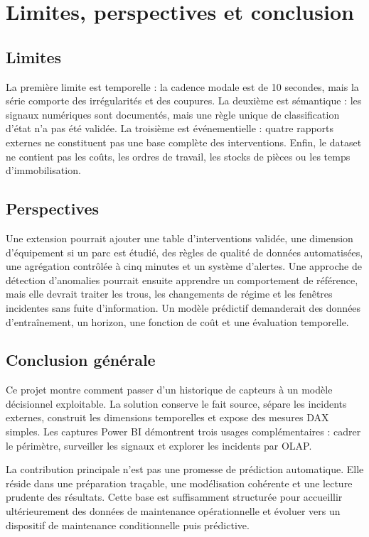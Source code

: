 \chapter{Limites, perspectives et conclusion}

\section{Limites}
La première limite est temporelle : la cadence modale est de 10 secondes, mais la série comporte des irrégularités et des coupures. La deuxième est sémantique : les signaux numériques sont documentés, mais une règle unique de classification d'état n'a pas été validée. La troisième est événementielle : quatre rapports externes ne constituent pas une base complète des interventions. Enfin, le dataset ne contient pas les coûts, les ordres de travail, les stocks de pièces ou les temps d'immobilisation.

\section{Perspectives}
Une extension pourrait ajouter une table d'interventions validée, une dimension d'équipement si un parc est étudié, des règles de qualité de données automatisées, une agrégation contrôlée à cinq minutes et un système d'alertes. Une approche de détection d'anomalies pourrait ensuite apprendre un comportement de référence, mais elle devrait traiter les trous, les changements de régime et les fenêtres incidentes sans fuite d'information. Un modèle prédictif demanderait des données d'entraînement, un horizon, une fonction de coût et une évaluation temporelle.

\section{Conclusion générale}
Ce projet montre comment passer d'un historique de capteurs à un modèle décisionnel exploitable. La solution conserve le fait source, sépare les incidents externes, construit les dimensions temporelles et expose des mesures DAX simples. Les captures Power BI démontrent trois usages complémentaires : cadrer le périmètre, surveiller les signaux et explorer les incidents par OLAP.

La contribution principale n'est pas une promesse de prédiction automatique. Elle réside dans une préparation traçable, une modélisation cohérente et une lecture prudente des résultats. Cette base est suffisamment structurée pour accueillir ultérieurement des données de maintenance opérationnelle et évoluer vers un dispositif de maintenance conditionnelle puis prédictive.
